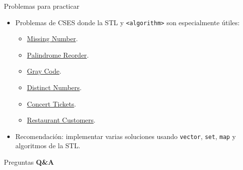 \documentclass[aspectratio=169]{beamer}
\begin{document}
\begin{frame}{Problemas para practicar}
  \begin{itemize}
    \item Problemas de CSES donde la STL y \texttt{<algorithm>} son especialmente útiles:
      \begin{itemize}
        \item \href{https://cses.fi/problemset/task/1083}{Missing Number}.
        \item \href{https://cses.fi/problemset/task/1755}{Palindrome Reorder}.
        \item \href{https://cses.fi/problemset/task/2205}{Gray Code}.
        \item \href{https://cses.fi/problemset/task/1621}{Distinct Numbers}.
        \item \href{https://cses.fi/problemset/task/1091}{Concert Tickets}.
        \item \href{https://cses.fi/problemset/task/1619}{Restaurant Customers}.
      \end{itemize}
    \item Recomendación: implementar varias soluciones usando \texttt{vector}, \texttt{set}, \texttt{map} y algoritmos de la STL.
  \end{itemize}
\end{frame}

\begin{frame}{Preguntas}
  \centering
  \Huge
  \textbf{Q\&A}
\end{frame}
\end{document}
